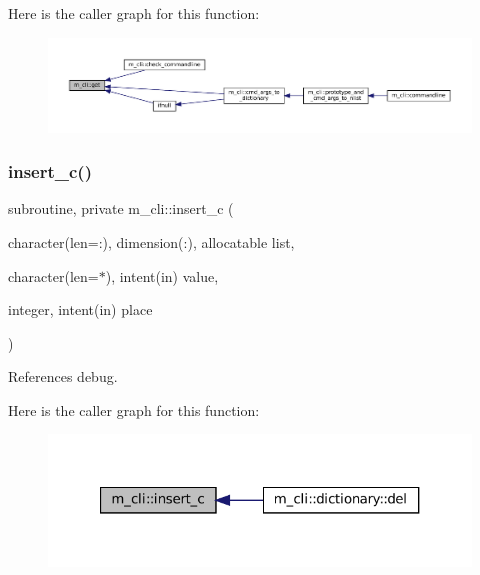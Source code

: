 Here is the caller graph for this function\+:
\nopagebreak
\begin{figure}[H]
\begin{center}
\leavevmode
\includegraphics[width=350pt]{namespacem__cli_a45783c194a1484042f63c58b180ca8df_icgraph}
\end{center}
\end{figure}
\mbox{\label{namespacem__cli_a9baf1cf0e20942fbde8c025ead5a30db}} 
\subsubsection{\texorpdfstring{insert\+\_\+c()}{insert\_c()}}
{\footnotesize\ttfamily subroutine, private m\+\_\+cli\+::insert\+\_\+c (\begin{DoxyParamCaption}\item[{character(len=\+:), dimension(\+:), allocatable}]{list,  }\item[{character(len=$\ast$), intent(in)}]{value,  }\item[{integer, intent(in)}]{place }\end{DoxyParamCaption})\hspace{0.3cm}{\ttfamily [private]}}



References debug.

Here is the caller graph for this function\+:
\nopagebreak
\begin{figure}[H]
\begin{center}
\leavevmode
\includegraphics[width=321pt]{namespacem__cli_a9baf1cf0e20942fbde8c025ead5a30db_icgraph}
\end{center}
\end{figure}
\mbox{\label{namespacem__cli_a030e31579a7968aea68d80db1e36ebfd}} 
